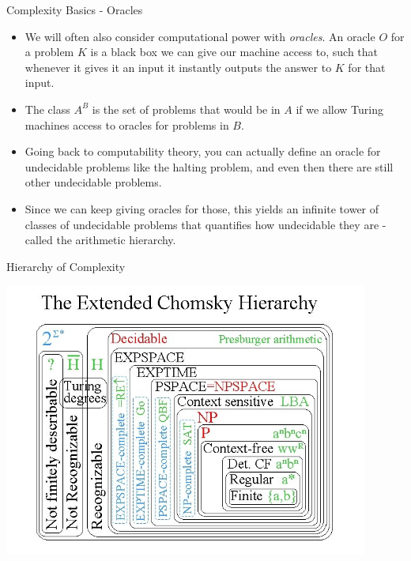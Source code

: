 \documentclass[aspectratio=169]{beamer}
\begin{document}
\begin{frame}{Complexity Basics - Oracles}
  
  \begin{itemize}
    \item We will often also consider computational power with \emph{oracles}. An oracle $O$ for a problem $K$ is a black box we can give our machine access to, such that whenever it gives it an input it instantly outputs the answer to $K$ for that input. \pause
    \item The class $A^B$ is the set of problems that would be in $A$ if we allow Turing machines access to oracles for problems in $B$. \pause
    \item Going back to computability theory, you can actually define an oracle for undecidable problems like the halting problem, and even then there are still other undecidable problems. \pause
    \item Since we can keep giving oracles for those, this yields an infinite tower of classes of undecidable problems that quantifies how undecidable they are - called the arithmetic hierarchy. 
  \end{itemize}
\end{frame}

\begin{frame}{Hierarchy of Complexity}

  \begin{center}
    \includegraphics[width=0.9\textwidth, height=0.9\textheight, keepaspectratio]{chomsky.jpg}
  \end{center}
\end{frame}
\end{document}
